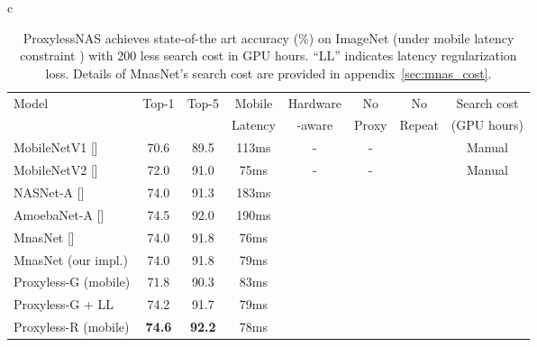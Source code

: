 \documentclass{article} \usepackage{iclr2019_conference,times}
\newcommand{\xmark}{\text{\ding{55}}}
\newcommand{\cmark}{\text{\ding{51}}}
\begin{document}
\begin{table}[t]
    \centering
\begin{tabular}{c}
    \begin{minipage}{1\linewidth}
        \begin{tabular}{l | c | c | c | c | c | c | c }
            \hline
            \multirow{2}{*}{Model} & \multirow{2}{*}{Top-1} & \multirow{2}{*}{Top-5} & Mobile & Hardware & No & No & Search cost \\
            & & & Latency & -aware & Proxy & Repeat & (GPU hours) \\
            \hline
            MobileNetV1 [\citenum{howard2017mobilenets}] & 70.6 & 89.5 & 113ms & - & - & \xmark & Manual \\
            MobileNetV2 [\citenum{sandler2018mobilenetv2}] & 72.0 & 91.0 & 75ms & - & - & \xmark & Manual \\
            \hline 
            NASNet-A [\citenum{zoph2017learning}] & 74.0 & 91.3 & 183ms & \xmark & \xmark & \xmark &  \\
            AmoebaNet-A [\citenum{real2018regularized}] & 74.5 & 92.0 & 190ms & \xmark & \xmark & \xmark &  \\
            MnasNet [\citenum{tan2018mnasnet}] & 74.0 & 91.8 & 76ms & \cmark & \xmark & \xmark &   \\
            MnasNet (our impl.) & 74.0 & 91.8 & 79ms & \cmark & \xmark & \xmark &  \\
            \hline 
            Proxyless-G (mobile) & 71.8 & 90.3 & 83ms & \xmark & \cmark & \cmark &  \\
            Proxyless-G + LL & 74.2 & 91.7 & 79ms & \cmark & \cmark & \cmark &  \\
            Proxyless-R (mobile) & \textbf{74.6} & \textbf{92.2} & 78ms & \cmark & \cmark & \cmark & 
            \\
            \hline
        \end{tabular}
    \end{minipage}
    \end{tabular}
\caption{ProxylessNAS achieves state-of-the art accuracy (\%) on ImageNet (under mobile latency constraint ) with 200 less search cost in GPU hours. ``LL'' indicates latency regularization loss. Details of MnasNet's search cost are provided in appendix~\ref{sec:mnas_cost}.}\label{tab:imagenet_mobile}
\end{table}
\end{document}
